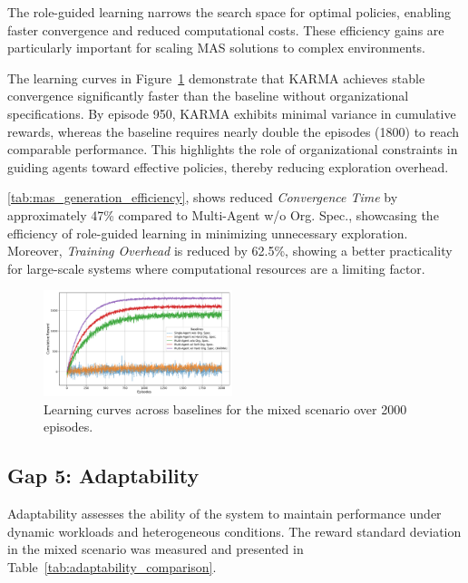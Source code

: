 \documentclass[conference]{IEEEtran}
\begin{document}
The role-guided learning narrows the search space for optimal policies, enabling faster convergence and reduced computational costs. These efficiency gains are particularly important for scaling MAS solutions to complex environments.

The learning curves in Figure~\ref{fig:learning_curves} demonstrate that KARMA achieves stable convergence significantly faster than the baseline without organizational specifications. By episode 950, KARMA exhibits minimal variance in cumulative rewards, whereas the baseline requires nearly double the episodes (1800) to reach comparable performance. This highlights the role of organizational constraints in guiding agents toward effective policies, thereby reducing exploration overhead.

\autoref{tab:mas_generation_efficiency}, shows reduced \textit{Convergence Time} by approximately 47\% compared to Multi-Agent w/o Org. Spec., showcasing the efficiency of role-guided learning in minimizing unnecessary exploration. Moreover, \textit{Training Overhead} is reduced by 62.5\%, showing a better practicality for large-scale systems where computational resources are a limiting factor.

\begin{figure}[h!]
    \centering
    \includegraphics[width=0.49\textwidth]{figures/learning_curves.pdf}
    \caption{Learning curves across baselines for the mixed scenario over 2000 episodes.}
    \label{fig:learning_curves}
\end{figure}


\subsection{Gap 5: Adaptability}
Adaptability assesses the ability of the system to maintain performance under dynamic workloads and heterogeneous conditions. The reward standard deviation in the mixed scenario was measured and presented in Table~\ref{tab:adaptability_comparison}.
\end{document}
